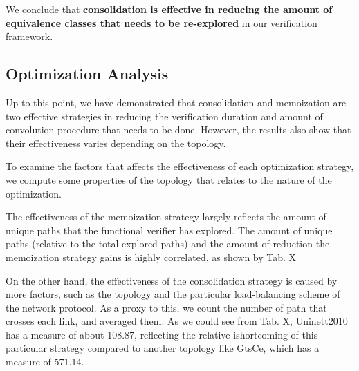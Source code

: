 We conclude that \textbf{consolidation is effective in reducing the amount of equivalence classes that 
needs to be re-explored} in our verification framework.

\subsection{Optimization Analysis}



Up to this point, we have demonstrated that consolidation and memoization are two effective strategies in 
reducing the verification duration and amount of convolution procedure that needs to be done.
However, the results also show that their effectiveness varies depending on the topology.

To examine the factors that affects the effectiveness of each optimization strategy, we compute some properties 
of the topology that relates to the nature of the optimization.

The effectiveness of the memoization strategy largely reflects the amount of unique paths that the functional 
verifier has explored.
The amount of unique paths (relative to the total explored paths) and the amount of reduction the memoization 
strategy gains is highly correlated, as shown by Tab. X

On the other hand, the effectiveness of the consolidation strategy is caused by more factors, such as the 
topology and the particular load-balancing scheme of the network protocol. 
As a proxy to this, we count the number of path that crosses each link, and averaged them.
As we could see from Tab. X, Uninett2010 has a measure of about 108.87, reflecting the relative ishortcoming 
of this particular strategy compared to another topology like GtsCe, which has a measure of 571.14.


